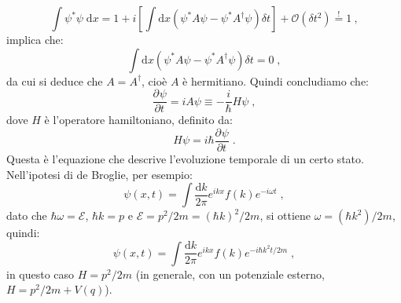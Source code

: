 \documentclass[12pt,a4paper]{report}
\theoremstyle{definition}
\newcommand{\pdev}[3][]{\frac{\partial^{#1} #2}{\partial #3^{#1}}}
\numberwithin{equation}{section}
\newcommand{\diff}[1][]{\mathrm{d}#1}
\begin{document}
$$
\int \psi^*\psi\;\diff{x}=1+i\left[\int\diff{x}(\psi^*A\psi-\psi^*A^{\dagger}\psi)\delta t\right]+\mathcal{O}(\delta t^2)\stackrel{!}{=}1\:,
$$
implica che:
$$
\int\diff{x}(\psi^*A\psi-\psi^*A^{\dagger}\psi)\delta t=0\;,
$$
da cui si deduce che $A=A^{\dagger}$, cioè $A$ è hermitiano. Quindi concludiamo che:
$$
\pdev{\psi}{t}=iA\psi\equiv -\frac{i}{\hbar}H\psi\;,
$$
dove $H$ è l'operatore hamiltoniano, definito da:
\begin{equation}
H\psi=i\hbar\pdev{\psi}{t}\;.
\end{equation}
Questa è l'equazione che descrive l'evoluzione temporale di un certo stato. \\
Nell'ipotesi di de Broglie, per esempio:
$$
\psi(x,t)=\int \frac{\diff{k}}{2\pi} e^{ikx}f(k)e^{-i\omega t}\;,
$$
dato che $\hbar\omega=\mathcal{E}$, $\hbar k=p$ e $\mathcal{E}=p^2/2m=(\hbar k)^2/2m$, si ottiene $\omega=(\hbar k^2)/2m$, quindi:
$$
\psi(x,t)=\int\frac{\diff{k}}{2\pi}e^{ikx}f(k)e^{-i\hbar k^2t/2m}\;,
$$
in questo caso $H=p^2/2m$ (in generale, con un potenziale esterno, $H=p^2/2m+V(q)$).
\end{document}
